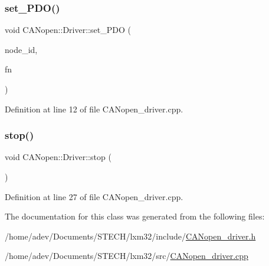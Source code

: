 \subsubsection{\texorpdfstring{set\+\_\+\+P\+D\+O()}{set\_PDO()}}
{\footnotesize\ttfamily void C\+A\+Nopen\+::\+Driver\+::set\+\_\+\+P\+DO (\begin{DoxyParamCaption}\item[{uint8\+\_\+t}]{node\+\_\+id,  }\item[{\hyperlink{class_c_a_nopen_1_1_driver_af1538f81dbeb9dcafee3ff1a71c95be4}{P\+D\+O\+Function\+Code}}]{fn }\end{DoxyParamCaption})}



Definition at line 12 of file C\+A\+Nopen\+\_\+driver.\+cpp.

\mbox{\label{class_c_a_nopen_1_1_driver_abd7d88699d02c007d5f23e608d8f0a0a}} 
\subsubsection{\texorpdfstring{stop()}{stop()}}
{\footnotesize\ttfamily void C\+A\+Nopen\+::\+Driver\+::stop (\begin{DoxyParamCaption}{ }\end{DoxyParamCaption})}



Definition at line 27 of file C\+A\+Nopen\+\_\+driver.\+cpp.



The documentation for this class was generated from the following files\+:\begin{DoxyCompactItemize}
\item 
/home/adev/\+Documents/\+S\+T\+E\+C\+H/lxm32/include/\hyperlink{_c_a_nopen__driver_8h}{C\+A\+Nopen\+\_\+driver.\+h}\item 
/home/adev/\+Documents/\+S\+T\+E\+C\+H/lxm32/src/\hyperlink{_c_a_nopen__driver_8cpp}{C\+A\+Nopen\+\_\+driver.\+cpp}\end{DoxyCompactItemize}
